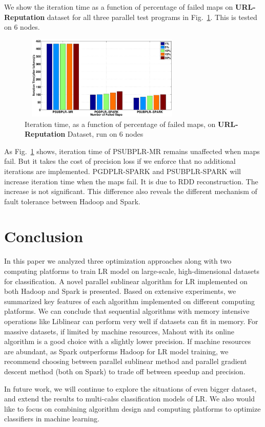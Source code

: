 \documentclass[10pt, conference, compsocconf]{IEEEtran}
\begin{document}
We show the iteration time as a function of percentage of failed maps on \textbf{URL-Reputation} dataset for all three parallel test programs in Fig.~\ref{fig:14}.
This is tested on 6 nodes.
\begin{figure}[tb]
\center \includegraphics[height=4cm,width=8cm]{img/fault_tolerance.eps}\vspace{-0.3cm}
\caption{Iteration time, as a function of percentage of failed maps, on \textbf{URL-Reputation} Dataset, run on 6 nodes}\label{fig:14}\vspace{-0.5cm}
\end{figure}
As Fig.~\ref{fig:14} shows, iteration time of PSUBPLR-MR remains unaffected when maps fail. But it takes the cost of precision loss if we enforce that no additional iterations are implemented.
PGDPLR-SPARK and PSUBPLR-SPARK will increase iteration time when the maps fail. It is due to RDD reconstruction. The increase is not significant.
This difference also reveals the different mechanism of fault tolerance between Hadoop and Spark.

\section{Conclusion} \label{sec:concl}
In this paper we analyzed three optimization approaches along with two computing platforms to train LR model on large-scale, high-dimensional datasets for classification. A novel parallel sublinear algorithm for LR implemented on both Hadoop and Spark is presented. Based on extensive experiments, we summarized key features of each algorithm implemented on different computing platforms.
We can conclude that sequential algorithms with memory intensive operations like Liblinear can perform very well if datasets can fit in memory.
For massive datasets, if limited by machine resources, Mahout with its online algorithm is a good choice with a slightly lower precision.
If machine resources are abundant, as Spark outperforms Hadoop for LR model training, we recommend choosing between parallel sublinear method and parallel gradient descent method (both on Spark) to trade off between speedup and precision.

In future work, we will continue to explore the situations of even bigger dataset, and extend the results to multi-calss classification models of LR. We also would like to focus on combining algorithm design and computing platforms to optimize classifiers in machine learning.

\begin{small}


\end{small}
\end{document}
